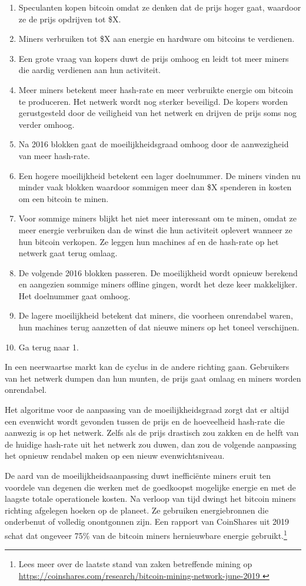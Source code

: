 \documentclass[smalldemyvopaper,11pt,twoside,onecolumn,openright,extrafontsizes]{memoir}
\begin{document}
\begin{enumerate}
\item Speculanten kopen bitcoin omdat ze denken dat de prijs hoger gaat, waardoor ze de prijs opdrijven tot \$X.
\item Miners verbruiken tot \$X aan energie en hardware om bitcoins te verdienen.
\item Een grote vraag van kopers duwt de prijs omhoog en leidt tot meer miners die aardig verdienen aan hun activiteit.
\item Meer miners betekent meer hash-rate en meer verbruikte energie om bitcoin te produceren. Het netwerk wordt nog sterker beveiligd. De kopers worden gerustgesteld door de veiligheid van het netwerk en drijven de prijs soms nog verder omhoog.
\item Na 2016 blokken gaat de moeilijkheidsgraad omhoog door de aanwezigheid van meer hash-rate.
\item Een hogere moeilijkheid betekent een lager doelnummer. De miners vinden nu minder vaak blokken waardoor sommigen meer dan \$X spenderen in kosten om een bitcoin te minen.
\item Voor sommige miners blijkt het niet meer interessant om te minen, omdat ze meer energie verbruiken dan de winst die hun activiteit oplevert wanneer ze hun bitcoin verkopen. Ze leggen hun machines af en de hash-rate op het netwerk gaat terug omlaag.
\item De volgende 2016 blokken passeren. De moeilijkheid wordt opnieuw berekend en aangezien sommige miners offline gingen, wordt het deze keer makkelijker. Het doelnummer gaat omhoog.
\item De lagere moeilijkheid betekent dat miners, die voorheen onrendabel waren, hun machines terug aanzetten of dat nieuwe miners op het toneel verschijnen.
\item Ga terug naar 1.
\end{enumerate}
In een neerwaartse markt kan de cyclus in de andere richting gaan. Gebruikers van het netwerk dumpen dan hun munten, de prijs gaat omlaag en miners worden onrendabel.

Het algoritme voor de aanpassing van de moeilijkheidsgraad zorgt dat er altijd een evenwicht wordt gevonden tussen de prijs en de hoeveelheid hash-rate die aanwezig is op het netwerk. Zelfs als de prijs drastisch zou zakken en de helft van de huidige hash-rate uit het netwerk zou duwen, dan zou de volgende aanpassing het opnieuw rendabel maken op een nieuw evenwichtsniveau.

De aard van de moeilijkheidsaanpassing duwt inefficiënte miners eruit ten voordele van degenen die werken met de goedkoopst mogelijke energie en met de laagste totale operationele kosten. Na verloop van tijd dwingt het bitcoin miners richting afgelegen hoeken op de planeet. Ze gebruiken energiebronnen die onderbenut of volledig onontgonnen zijn. Een rapport van CoinShares uit 2019 schat dat ongeveer 75\% van de bitcoin miners hernieuwbare energie gebruikt.\footnote{Lees meer over de laatste stand van zaken betreffende mining op \href{https://coinshares.com/research/bitcoin-mining-network-june-2019 }{https://coinshares.com/research/bitcoin-mining-network-june-2019 }}
\end{document}
